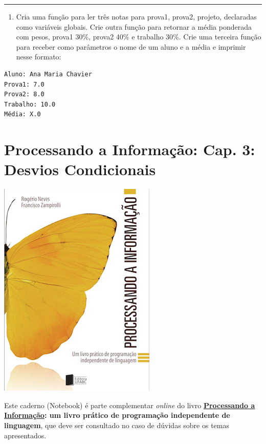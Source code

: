 \documentclass[12pt,a4paper]{article}
\providecommand{\tightlist}{%
      \setlength{\itemsep}{0pt}\setlength{\parskip}{0pt}}
\begin{document}
    \begin{center}\rule{0.5\linewidth}{0.5pt}\end{center}

\begin{enumerate}
\def\labelenumi{\arabic{enumi}.}
\setcounter{enumi}{4}
\tightlist
\item
  Cria uma função para ler três notas para prova1, prova2, projeto,
  declaradas como variáveis globais. Crie outra função para retornar a
  média ponderada com pesos, prova1 30\%, prova2 40\% e trabalho 30\%.
  Crie uma terceira função para receber como parâmetros o nome de um
  aluno e a média e imprimir nesse formato:
\end{enumerate}

\begin{verbatim}
Aluno: Ana Maria Chavier
Prova1: 7.0
Prova2: 8.0
Trabalho: 10.0
Média: X.0
\end{verbatim}

    \hypertarget{processando-a-informauxe7uxe3o-cap.-3-desvios-condicionais}{%
\section{Processando a Informação: Cap. 3: Desvios
Condicionais}\label{processando-a-informauxe7uxe3o-cap.-3-desvios-condicionais}}

    \includegraphics{"figs/Capa_Processando_Informacao.jpg"}

Este caderno (Notebook) é parte complementar \emph{online} do livro
\textbf{\href{https://editora.ufabc.edu.br/matematica-e-ciencias-da-computacao/58-processando-a-informacao}{Processando
a Informação}: um livro prático de programação independente de
linguagem}, que deve ser consultado no caso de dúvidas sobre os temas
apresentados.
\end{document}
